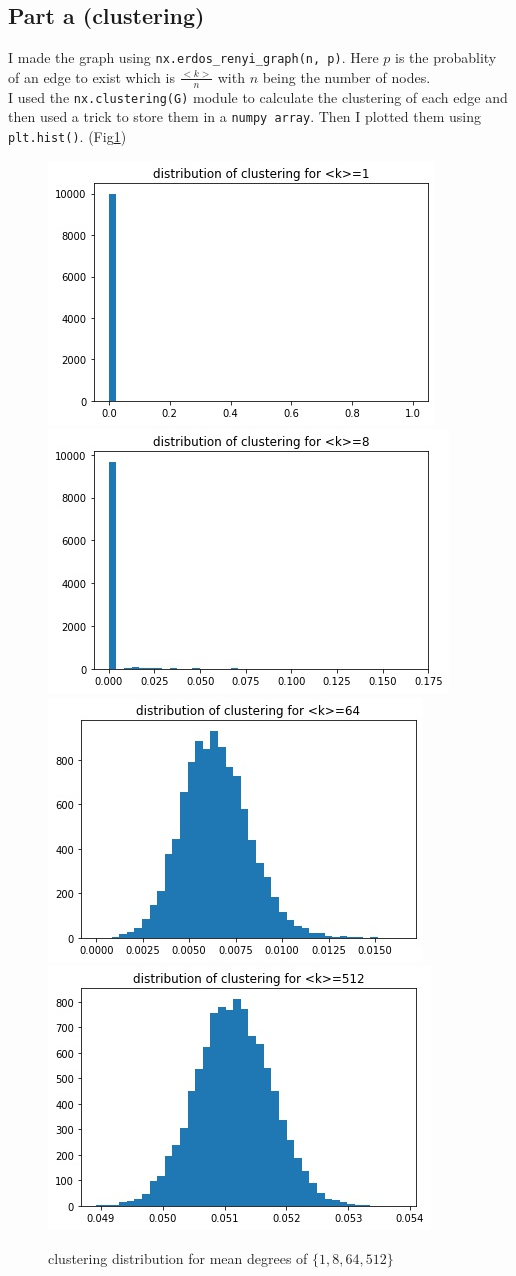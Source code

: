\documentclass[12pt]{article}
\begin{document}
	\subsection{Part a (clustering)}
	I made the graph using \texttt{nx.erdos\_renyi\_graph(n, p)}. Here $p$ is the probablity of an edge to exist which is $\frac{<k>}{n}$ with $n$ being the number of nodes.\\
	I used the \texttt{nx.clustering(G)} module to calculate the clustering of each edge and then
	used a trick to store them in a \texttt{numpy array}. Then I plotted them using \texttt{plt.hist()}. (Fig\ref{fig:clust})
	\begin{figure}[h]
		\centering
		\includegraphics[width=.4\linewidth]{../p2/clust1.jpg}
		\includegraphics[width=.4\linewidth]{../p2/clust8.jpg}
		\includegraphics[width=.4\linewidth]{../p2/clust64.jpg}
		\includegraphics[width=.4\linewidth]{../p2/clust512.jpg}
		\label{fig:clust}
		\caption{clustering distribution for mean degrees of $\{1, 8, 64, 512\}$}
	\end{figure}
\end{document}
